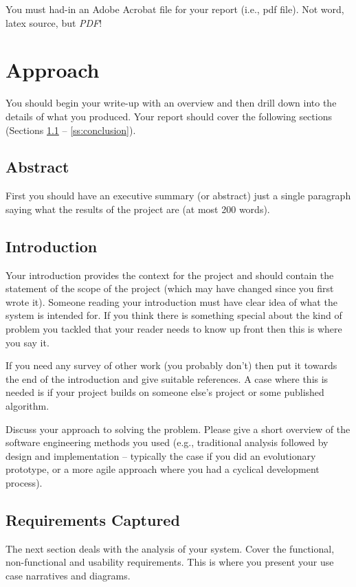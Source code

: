 \documentclass[11pt,a4paper]{article}
\begin{document}
You must had-in an Adobe Acrobat file for your report (i.e., pdf
file). Not word, latex source, but \emph{PDF}!

\section{Approach}

You should begin your write-up with an overview and then drill down
into the details of what you produced. Your report should cover the
following sections (Sections \ref{ss:introduction} --
\ref{ss:conclusion}).

\subsection*{Abstract}
First you should have an executive summary (or abstract) just a single
paragraph saying what the results of the project are (at most 200
words).

\subsection{Introduction}
\label{ss:introduction}

Your introduction provides the context for the project and should
contain the statement of the scope of the project (which may have
changed since you first wrote it). Someone reading your introduction
must have clear idea of what the system is intended for. If you think
there is something special about the kind of problem you tackled that
your reader needs to know up front then this is where you say it.

If you need any survey of other work (you probably don't) then put it
towards the end of the introduction and give suitable references. A
case where this is needed is if your project builds on someone else's
project or some published algorithm.

Discuss your approach to solving the problem. Please give a short
overview of the software engineering methods you used (e.g.,
traditional analysis followed by design and implementation -- typically
the case if you did an evolutionary prototype, or a more agile
approach where you had a cyclical development process). 

\subsection{Requirements Captured}

The next section deals with the analysis of your system. Cover the
functional, non-functional and usability requirements. This is where
you present your use case narratives and diagrams. 
\end{document}
